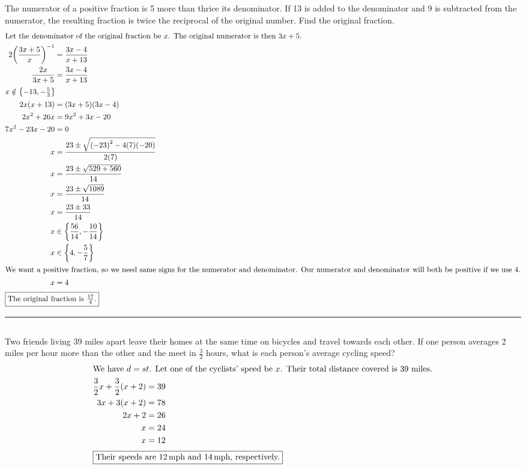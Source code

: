 	\subsection{}
		The numerator of a positive fraction is 5 more than thrice its denominator. If 13
		is added to the denominator and 9 is subtracted from the numerator, the resulting
		fraction is twice the reciprocal of the original number. Find the original fraction.
		\begin{align*}
			\intertext{Let the denominator of the original fraction be $x$. The original
			numerator is then $3x + 5$.}
			2{\left(\frac{3x + 5}{x}\right)}^{-1} &= \frac{3x - 4}{x + 13} \\
			\frac{2x}{3x + 5} &= \frac{3x - 4}{x + 13} \\
			\intertext{$x \notin \left\{-13, -\frac{5}{3}\right\}$}
			2x(x + 13) &= (3x + 5)(3x - 4) \\
			2x^2 + 26x &= 9x^2 + 3x - 20 \\
			7x^2 - 23x - 20 &= 0 \\
			x &= \frac{23 \pm \sqrt{{(-23)}^2 - 4(7)(-20)}}{2(7)} \\
			x &= \frac{23 \pm \sqrt{529 + 560}}{14} \\
			x &= \frac{23 \pm \sqrt{1089}}{14} \\
			x &= \frac{23 \pm 33}{14} \\
			x &\in \left\{\frac{56}{14}, -\frac{10}{14}\right\} \\
			x &\in \left\{4, -\frac{5}{7}\right\} \\
			\intertext{We want a positive fraction, so we need same signs for the numerator
			and denominator. Our numerator and denominator will both be positive if we use 4.}
			x &= 4 \\
			\intertext{\centering\fbox{The original fraction is $\frac{17}{4}$.}}
		\end{align*}
		\hrule{}

	\subsection{}
		Two friends living 39 miles apart leave their homes at the same time on bicycles
		and travel towards each other. If one person averages 2 miles per hour more than
		the other and the meet in $\frac{3}{2}$ hours, what is each person's average cycling
		speed?
		\begin{align*}
			\intertext{We have $d = st$. Let one of the cyclists' speed be $x$. Their total
			distance covered is 39 miles.}
			\frac{3}{2}x + \frac{3}{2}(x + 2) &= 39 \\
			3x + 3(x + 2) &= 78 \\
			2x + 2 &= 26 \\
			x &= 24 \\
			x &= 12 \\
			\intertext{\centering\fbox{Their speeds are \qty{12}{\unit{mph}} and \qty{14}{\unit{mph}}, respectively.}}
		\end{align*}
